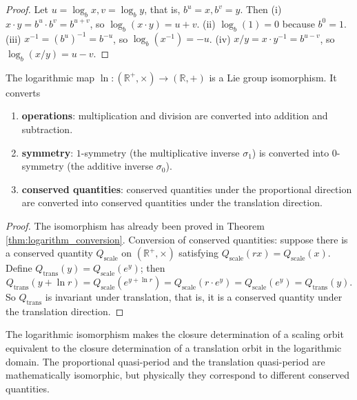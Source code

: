 \begin{proof}
Let $u = \log_b x, v = \log_b y$, that is, $b^u = x, b^v = y$. Then
(i) $x \cdot y = b^u \cdot b^v = b^{u+v}$, so $\log_b(x \cdot y) = u + v$.
(ii) $\log_b(1) = 0$ because $b^0 = 1$.
(iii) $x^{-1} = (b^u)^{-1} = b^{-u}$, so $\log_b(x^{-1}) = -u$.
(iv) $x/y = x \cdot y^{-1} = b^{u-v}$, so $\log_b(x/y) = u - v$.
\end{proof}

\begin{theorem}\label{thm:log_isomorphism_conservation}
The logarithmic map $\ln: (\mathbb{R}^+, \times) \to (\mathbb{R}, +)$ is a Lie group isomorphism. It converts
\begin{enumerate}[label=(\roman*)]
    \item \textbf{operations}: multiplication and division are converted into addition and subtraction.
    \item \textbf{symmetry}: $1$-symmetry (the multiplicative inverse $\sigma_1$) is converted into $0$-symmetry (the additive inverse $\sigma_0$).
    \item \textbf{conserved quantities}: conserved quantities under the proportional direction are converted into conserved quantities under the translation direction.
\end{enumerate}
\end{theorem}

\begin{proof}
The isomorphism has already been proved in Theorem \ref{thm:logarithm_conversion}. Conversion of conserved quantities: suppose there is a conserved quantity $Q_{\text{scale}}$ on $(\mathbb{R}^+, \times)$ satisfying $Q_{\text{scale}}(r x) = Q_{\text{scale}}(x)$. Define $Q_{\text{trans}}(y) = Q_{\text{scale}}(e^y)$; then
\[
Q_{\text{trans}}(y + \ln r) = Q_{\text{scale}}(e^{y + \ln r}) = Q_{\text{scale}}(r \cdot e^y) = Q_{\text{scale}}(e^y) = Q_{\text{trans}}(y).
\]
So $Q_{\text{trans}}$ is invariant under translation, that is, it is a conserved quantity under the translation direction.
\end{proof}

\begin{corollary}\label{cor:logarithm_judgement_equivalence}
The logarithmic isomorphism makes the closure determination of a scaling orbit equivalent to the closure determination of a translation orbit in the logarithmic domain. The proportional quasi-period and the translation quasi-period are mathematically isomorphic, but physically they correspond to different conserved quantities.
\end{corollary}


